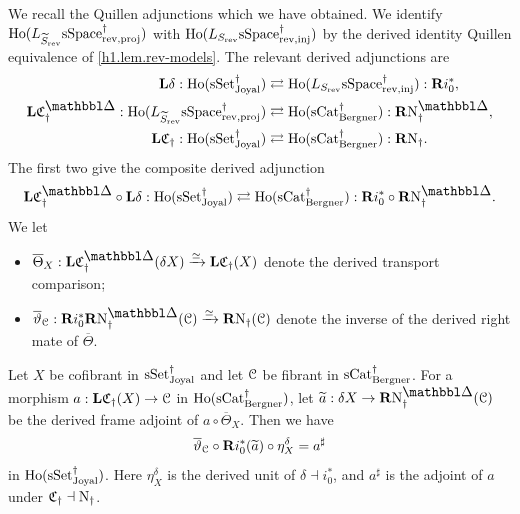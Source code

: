 \documentclass[a4paper,dvipdfmx,11pt]{amsart}
\begin{document}
\begin{notation}
  We recall the Quillen adjunctions which we have obtained.
  We identify $\mathrm{Ho}(L_{\widetilde S_{\mathrm{rev}}}\mathrm{sSpace}^{\dag}_{\mathrm{rev},\mathrm{proj}})$ with $\mathrm{Ho}(L_{S_{\mathrm{rev}}}\mathrm{sSpace}^{\dag}_{\mathrm{rev},\mathrm{inj}})$ by the derived identity Quillen equivalence of \cref{h1.lem.rev-models}.
  The relevant derived adjunctions are
  \begin{align}
    \bfL\delta:
    \Ho(\sSet^{\dag}_{\Joyal})
    &\rightleftarrows
    \Ho(L_{S_{\rev}}\sSpace^{\dag}_{\rev,\inj})
    :\bfR i_0^*,\\
    \bfL\frakC^{\prism}_{\dag}:
    \Ho(L_{\widetilde S_{\rev}}\sSpace^{\dag}_{\rev,\proj})
    &\rightleftarrows
    \Ho(\sCat^{\dag}_{\Bergner})
    :\bfR\N^{\prism}_{\dag},\\
    \bfL\frakC_{\dag}:
    \Ho(\sSet^{\dag}_{\Joyal})
    &\rightleftarrows
    \Ho(\sCat^{\dag}_{\Bergner})
    :\bfR \N_{\dag}.
  \end{align}
  The first two give the composite derived adjunction
  \begin{align}
    \bfL\frakC^{\prism}_{\dag} \circ\bfL\delta
    : \Ho(\sSet^{\dag}_{\Joyal})
    \rightleftarrows
    \Ho(\sCat^{\dag}_{\Bergner}) : 
    \bfR i_0^* \circ\bfR\N^{\prism}_{\dag}.
  \end{align}
  We let 
  \begin{itemize}
    \item $\overline\Theta_X:\bfL\frakC^{\prism}_{\dag}(\delta X) \xrightarrow{\simeq} \bfL\frakC_{\dag}(X)$ denote the derived transport comparison;
    \item $\overline\vartheta_{\calC}: \bfR i_0^*\bfR\N^{\prism}_{\dag}(\calC) \xrightarrow{\simeq} \bfR \N_{\dag}(\calC)$ denote the inverse of the derived right mate of $\overline\Theta$.
  \end{itemize}
\end{notation}

\begin{lemma}\label{jt.lem.unit-triangle}
  Let $X$ be cofibrant in $\mathrm{sSet}^{\dag}_{\mathrm{Joyal}}$ and let $\mathcal{C}$ be fibrant in $\mathrm{sCat}^{\dag}_{\mathrm{Bergner}}$.
  For a morphism $a:\mathbf{L}\mathfrak{C}_{\dag}(X)\to\mathcal{C}$ in $\mathrm{Ho}(\mathrm{sCat}^{\dag}_{\mathrm{Bergner}})$, let $\widetilde a:\delta X\to\bfR\N^{\prism}_{\dag}(\calC)$ be the derived frame adjoint of $a\circ\overline\Theta_X$.
  Then we have 
  \begin{align}
    \overline\vartheta_{\mathcal{C}}\circ\mathbf{R} i_0^*(\widetilde a)\circ\eta_X^{\delta} = a^{\sharp}
  \end{align}
  in $\mathrm{Ho}(\mathrm{sSet}^{\dag}_{\mathrm{Joyal}})$.
  Here $\eta_X^{\delta}$ is the derived unit of $\delta\dashv i_0^*$, and $a^{\sharp}$ is the adjoint of $a$ under $\mathfrak{C}_{\dag}\dashv \mathrm{N}_{\dag}$.
\end{lemma}
\end{document}
